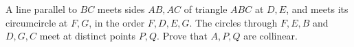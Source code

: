 A line parallel to $BC$ meets sides $AB,AC$ of triangle $ABC$ at $D,E$, and meets its circumcircle at $F,G$, in the order $F,D,E,G$. The circles through $F,E,B$ and $D,G,C$ meet at distinct points $P,Q$. Prove that $A,P,Q$ are collinear.
